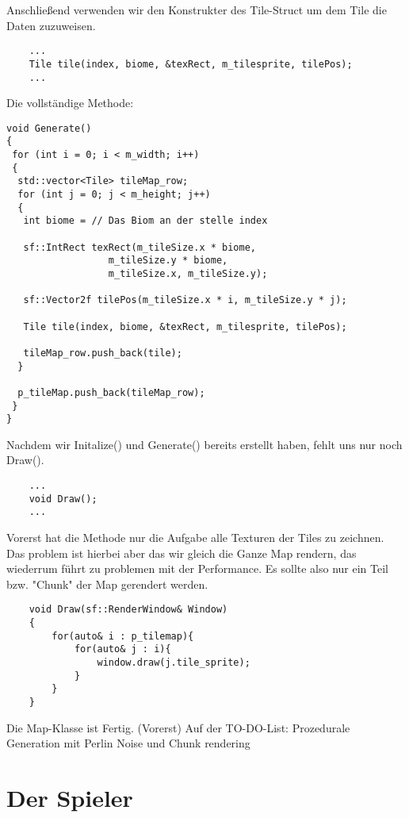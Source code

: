 Anschließend verwenden wir den Konstrukter des Tile-Struct um dem Tile die Daten zuzuweisen. 

\begin{lstlisting}
	...
	Tile tile(index, biome, &texRect, m_tilesprite, tilePos);
	...
\end{lstlisting}

Die vollständige Methode: 

\begin{lstlisting}
void Generate()
{
 for (int i = 0; i < m_width; i++)
 {
  std::vector<Tile> tileMap_row;
  for (int j = 0; j < m_height; j++)
  {
   int biome = // Das Biom an der stelle index
			
   sf::IntRect texRect(m_tileSize.x * biome, 
   			      m_tileSize.y * biome, 
   			      m_tileSize.x, m_tileSize.y);
   					   
   sf::Vector2f tilePos(m_tileSize.x * i, m_tileSize.y * j);
			
   Tile tile(index, biome, &texRect, m_tilesprite, tilePos);
			
   tileMap_row.push_back(tile);
  }
		
  p_tileMap.push_back(tileMap_row);
 }
}
\end{lstlisting}


Nachdem wir Initalize() und Generate() bereits erstellt haben, fehlt uns nur noch Draw(). 

\begin{lstlisting}
	...
	void Draw();
	...
\end{lstlisting}

Vorerst hat die Methode nur die Aufgabe alle Texturen der Tiles zu zeichnen. Das problem ist hierbei aber das wir gleich die Ganze Map rendern, das wiederrum führt zu problemen mit der Performance. Es sollte also nur ein Teil bzw. "Chunk" der Map gerendert werden. 

\begin{lstlisting}
	void Draw(sf::RenderWindow& Window)
	{
		for(auto& i : p_tilemap){
			for(auto& j : i){
				window.draw(j.tile_sprite); 
			}
		}	
	}
\end{lstlisting}

Die Map-Klasse ist Fertig. (Vorerst)
Auf der TO-DO-List: Prozedurale Generation mit Perlin Noise und Chunk rendering


\newpage
\section{Der Spieler}

